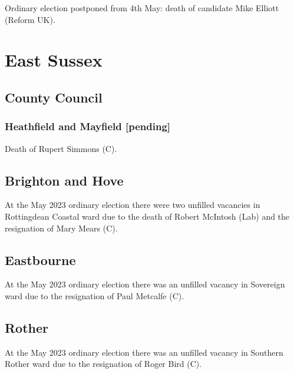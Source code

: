 \documentclass[a4paper,openany]{book}
\begin{document}
\begin{resultsiii}

Ordinary election postponed from 4th May: death of candidate Mike Elliott (Reform UK).

\section{East Sussex}

\subsection*{County Council}

\subsubsection*{Heathfield and Mayfield \hspace*{\fill}\nolinebreak[1]%
	\enspace\hspace*{\fill}
	[pending]}


Death of Rupert Simmons (C).

\subsection*{Brighton and Hove}

At the May 2023 ordinary election there were two unfilled vacancies in Rottingdean Coastal ward due to the death of Robert McIntosh (Lab) and the resignation of Mary Mears (C).%

\subsection*{Eastbourne}

At the May 2023 ordinary election there was an unfilled vacancy in Sovereign ward due to the resignation of Paul Metcalfe (C).%

\subsection*{Rother}

At the May 2023 ordinary election there was an unfilled vacancy in Southern Rother ward due to the resignation of Roger Bird (C).%


\end{resultsiii}
\end{document}
